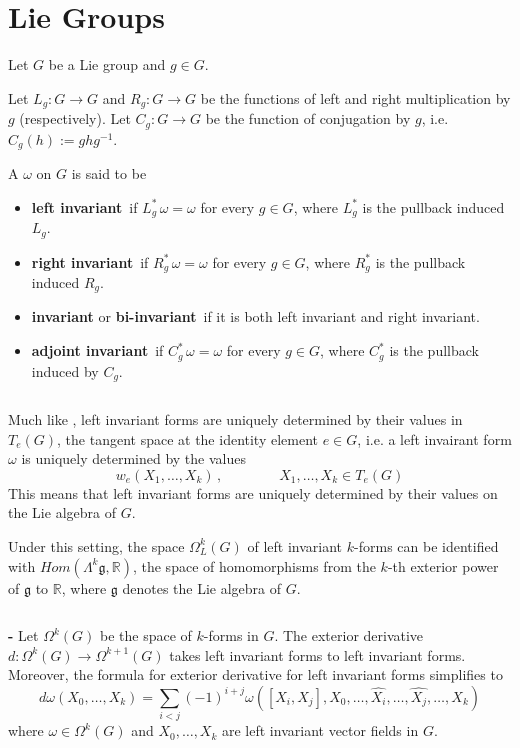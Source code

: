 \documentclass[12pt]{article}
\begin{document}

\section{Lie Groups}

Let $G$ be a Lie group and $g \in G$.

Let $L_g:G \longrightarrow G$ and $R_g:G \longrightarrow G$ be the functions of left and right multiplication by $g$ (respectively). Let $C_g:G \longrightarrow G$ be the function of conjugation by $g$, i.e. $C_g(h):=ghg^{-1}$.

A  $\omega$ on $G$ is said to be
\begin{itemize}
\item {\bf left invariant}$\,$ if $L_g^*\, \omega = \omega$ for every $g \in G$, where $L_g^*$ is the pullback induced $L_g$.
\item {\bf right invariant}$\,$ if $R_g^*\, \omega = \omega$ for every $g \in G$, where $R_g^*$ is the pullback induced $R_g$.
\item {\bf invariant} or {\bf bi-invariant}$\,$ if it is both left invariant and right invariant.
\item {\bf adjoint invariant}$\,$ if $C_g^*\, \omega = \omega$ for every $g \in G$, where $C_g^*$ is the pullback induced by $C_g$.
\end{itemize}
$\,$

Much like , left invariant forms are uniquely determined by their values  in $T_e(G)$, the tangent space at the identity element $e \in G$, i.e. a left invairant form $\omega$ is uniquely determined by the values
\begin{displaymath}
w_e(X_1, \dots, X_k)\,,\qquad\qquad X_1, \dots, X_k \in T_e(G)
\end{displaymath}
This means that left invariant forms are uniquely determined by their values on the Lie algebra of $G$.

Under this setting, the space $\Omega^k_L(G)$ of left invariant $k$-forms can be identified with $Hom(\Lambda^k \mathfrak{g}, \mathbb{R})$, the space of homomorphisms from the $k$-th exterior power of $\mathfrak{g}$ to $\mathbb{R}$, where $\mathfrak{g}$ denotes the Lie algebra of $G$.

$\,$

{\bf {} -} Let $\Omega^k(G)$ be the space of $k$-forms in $G$. The exterior derivative $d:\Omega^k(G) \longrightarrow \Omega^{k+1}(G)$ takes left invariant forms to left invariant forms. Moreover, the formula for exterior derivative for left invariant forms simplifies to
\begin{displaymath}
d\omega (X_0, \dots , X_k) = \sum_{i<j} (-1)^{i+j} \omega([X_i, X_j], X_0, \dots, \hat{X_i}, \dots, \hat{X_j}, \dots, X_k)
\end{displaymath}
where $\omega \in \Omega^k(G)$ and $X_0, \dots , X_k$ are left invariant vector fields in $G$.
\end{document}
